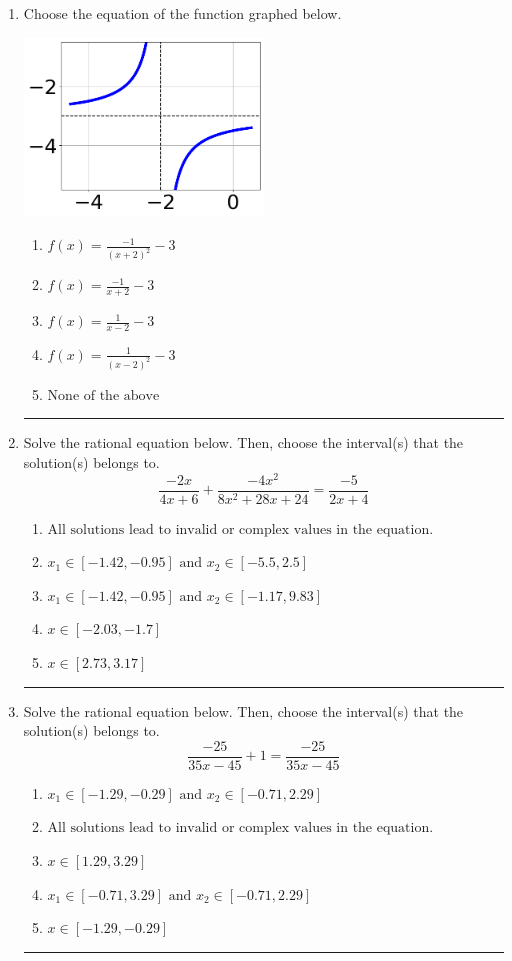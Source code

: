 \documentclass[14pt]{extbook}
\newcommand{\litem}[1]{\item#1\hspace*{-1cm}\rule{\textwidth}{0.4pt}}
\begin{document}
\begin{enumerate}
{\begin{enumerate}[label=\Alph*.]
\end{enumerate} }
\litem{
Choose the equation of the function graphed below.
\begin{center}
    \includegraphics[width=0.5\textwidth]{../Figures/rationalGraphToEquationB.png}
\end{center}
\begin{enumerate}[label=\Alph*.]
\item \( f(x) = \frac{-1}{(x + 2)^2} - 3 \)
\item \( f(x) = \frac{-1}{x + 2} - 3 \)
\item \( f(x) = \frac{1}{x - 2} - 3 \)
\item \( f(x) = \frac{1}{(x - 2)^2} - 3 \)
\item \( \text{None of the above} \)

\end{enumerate} }
\litem{
Solve the rational equation below. Then, choose the interval(s) that the solution(s) belongs to.\[ \frac{-2x}{4x + 6} + \frac{-4x^{2}}{8x^{2} +28 x + 24} = \frac{-5}{2x + 4} \]\begin{enumerate}[label=\Alph*.]
\item \( \text{All solutions lead to invalid or complex values in the equation.} \)
\item \( x_1 \in [-1.42, -0.95] \text{ and } x_2 \in [-5.5,2.5] \)
\item \( x_1 \in [-1.42, -0.95] \text{ and } x_2 \in [-1.17,9.83] \)
\item \( x \in [-2.03,-1.7] \)
\item \( x \in [2.73,3.17] \)

\end{enumerate} }
\litem{
Solve the rational equation below. Then, choose the interval(s) that the solution(s) belongs to.\[ \frac{-25}{35x -45} + 1 = \frac{-25}{35x -45} \]\begin{enumerate}[label=\Alph*.]
\item \( x_1 \in [-1.29, -0.29] \text{ and } x_2 \in [-0.71,2.29] \)
\item \( \text{All solutions lead to invalid or complex values in the equation.} \)
\item \( x \in [1.29,3.29] \)
\item \( x_1 \in [-0.71, 3.29] \text{ and } x_2 \in [-0.71,2.29] \)
\item \( x \in [-1.29,-0.29] \)


\end{enumerate}}
\end{enumerate}
\end{document}
